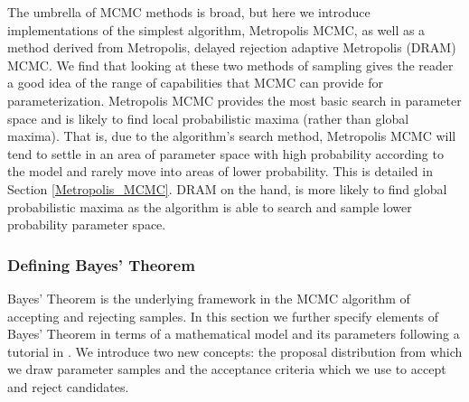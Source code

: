 \par The umbrella of MCMC methods is broad, but here we introduce implementations of the simplest algorithm, Metropolis MCMC, as well as a method derived from Metropolis, delayed rejection adaptive Metropolis (DRAM) MCMC. We find that looking at these two methods of sampling gives the reader a good idea of the range of capabilities that MCMC can provide for parameterization. Metropolis MCMC provides the most basic search in parameter space and is likely to find local probabilistic maxima (rather than global maxima). That is, due to the algorithm's search method, Metropolis MCMC will tend to settle in an area of parameter space with high probability according to the model and rarely move into areas of lower probability. This is detailed in Section \ref{Metropolis_MCMC}. DRAM on the hand, is more likely to find global probabilistic maxima as the algorithm is able to search and sample lower probability parameter space.

\subsubsection{Defining Bayes' Theorem} 
Bayes' Theorem is the underlying framework in the MCMC algorithm of accepting and rejecting samples. In this section we further specify elements of Bayes' Theorem in terms of a mathematical model and its parameters following a tutorial in \cite{astrostats}. We introduce two new concepts: the proposal distribution from which we draw parameter samples and the acceptance criteria which we use to accept and reject candidates.
